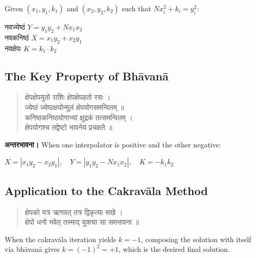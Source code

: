 \documentclass[11pt,a4paper]{article}
\newcommand{\dev}[1]{{\devanagarifont #1}}
\newenvironment{sanskritverse}{%
  \begin{verse}
}{%
  \end{verse}
}
\newcommand{\vs}{\vspace{0.5em}}
\begin{document}
\vs

\noindent Given $(x_1, y_1, k_1)$ and $(x_2, y_2, k_2)$ such that $Nx_i^2 + k_i = y_i^2$:

\begin{center}
\dev{%
नवज्येष्ठं $Y = y_1 y_2 + N x_1 x_2$}\\[0.3em]
\dev{%
नवकनिष्ठं $X = x_1 y_2 + x_2 y_1$}\\[0.3em]
\dev{%
नवक्षेपः $K = k_1 \cdot k_2$}
\end{center}

\vs

\subsection*{The Key Property of Bh\={a}van\={a}}

\begin{sanskritverse}
\dev{%
क्षेपक्षेपयुतो राशिः क्षेपक्षेपहतो रसः ।\\
ज्येष्ठं ज्येष्ठक्षयोन्मूलं क्षेपयोगसमन्वितम् ॥}\\[0.5em]
\dev{%
कनिष्ठकनिष्ठयोगाभ्यां क्षुद्रकं तत्समन्वितम् ।\\
क्षेपयोगश्च तद्वेष्टो भावनेयं प्रचक्षते ॥}
\end{sanskritverse}

\vs

\noindent\textbf{\dev{अन्तरभावना।}} When one interpolator is positive and the other negative:

\begin{center}
\dev{%
$X = |x_1 y_2 - x_2 y_1|, \quad Y = |y_1 y_2 - N x_1 x_2|, \quad K = -k_1 k_2$}
\end{center}

\vs

\subsection*{Application to the Cakrav\={a}la Method}

\begin{sanskritverse}
\dev{%
क्षेपको यत्र ऋणवत् तत्र द्विकृत्या सखे ।\\
क्षेपो धनो भवेत् तस्माद् युक्त्या सा समभावना ॥}
\end{sanskritverse}

\noindent When the cakrav\={a}la iteration yields $k = -1$, composing the solution with itself via bh\={a}van\={a} gives $k = (-1)^2 = +1$, which is the desired final solution.

\vs
\end{document}
